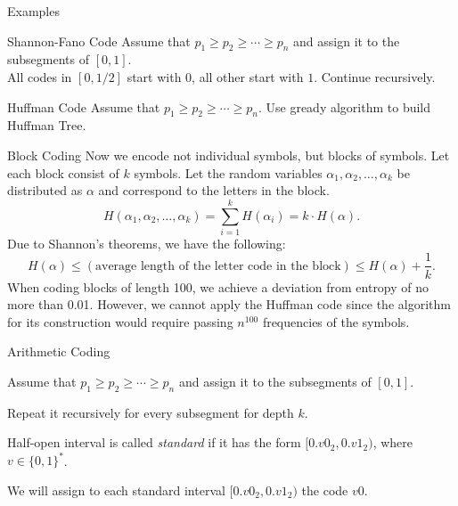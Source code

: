 \documentclass[handout,aspectratio=169]{beamer}
\newcommand{\bits}{\{0,1\}}
\newcommand{\seqn}[2]{{#1}_1,{#1}_2,\dotsc,{#1}_{#2}}
\begin{document}
    \begin{frame}{Examples}
        \begin{block}{Shannon-Fano Code}
            Assume that \(p_1 \ge p_2 \ge \dotsb \ge p_n\) and assign it to the subsegments of $[0,1]$. \\ All codes in $[0,1/2]$ start with $0$, all other start with $1$. Continue recursively. \vspace{2cm}

        \end{block}
        \begin{block}{Huffman Code}
            Assume that \(p_1 \ge p_2 \ge \dotsb \ge p_n\). Use gready algorithm to build Huffman Tree.
            \vspace{3cm}

        \end{block}
    \end{frame}

    \begin{frame}{Block Coding}
        Now we encode not individual symbols, but blocks of symbols.
        Let each block consist of \(k\) symbols. Let the random variables \(\seqn{\alpha}{k}\) be distributed as \(\alpha\) and correspond to the letters in the block.
        \[
        H(\seqn{\alpha}{k}) = \sum_{i=1}^k H(\alpha_i) = k \cdot H(\alpha).
        \]
        Due to Shannon's theorems, we have the following:
        \[
        H(\alpha) \le (\text{average length of the letter code in the block}) \le H(\alpha) +
        \frac{1}{k}.
        \]
        When coding blocks of length 100, we achieve a deviation from entropy of no more than 0.01. However, we cannot apply the Huffman code since the algorithm for its construction would require passing \(n^{100}\) frequencies of the symbols.
    \end{frame}


    \begin{frame}{Arithmetic Coding}



        \begin{definition}
            Assume that \(p_1 \ge p_2 \ge \dotsb \ge p_n\) and assign it to the subsegments of $[0,1]$.

            Repeat it recursively for every subsegment for depth $k$.

            Half-open interval is called \emph{standard} if it has the form
            \([0.v0_2, 0.v1_2)\), where \(v\in\bits^*\).

            We will assign to each standard interval \([0.v0_2, 0.v1_2)\) the code \(v0\).
            \vspace{5cm}


        \end{definition}
    \end{frame}
\end{document}
